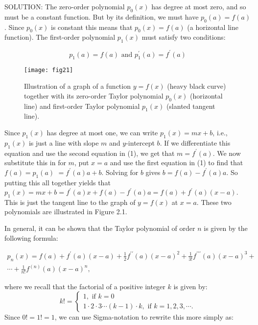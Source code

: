 \documentclass[../main.tex]{subfiles}
\begin{document}
SOLUTION: The zero-order polynomial $p_{0}(x)$ has degree at most zero, and so must be a constant function. But by its definition, we must have $p_{0}(a)=f(a)$. Since $p_{0}(x)$ is constant this means that $p_{0}(x)=f(a)$ (a horizontal line function). The first-order polynomial $p_{1}(x)$ must satisfy two conditions:


\begin{equation}\label{eq:1} \tag{1}
p_{1}(a)=f(a) \text { and } p_{1}^{\prime}(a)=f^{\prime}(a)
\end{equation}


\begin{figure}[H]
\centering
\texttt{[image: fig21]}
\caption{ Illustration of a graph of a function $y=f(x)$ (heavy black curve) together with its zero-order Taylor polynomial $p_{0}(x)$ (horizontal line) and first-order Taylor polynomial $p_{1}(x)$ (slanted tangent line). }
\label{fig:fig_2_1}
\end{figure}

Since $p_{1}(x)$ has degree at most one, we can write $p_{1}(x)=m x+b$, i.e., $p_{1}(x)$ is just a line with slope $m$ and $y$-intercept $b$. If we differentiate this equation and use the second equation in (1), we get that $m=f^{\prime}(a)$. We now substitute this in for $m$, put $x=a$ and use the first equation in (1) to find that $f(a)=p_{1}(a)$ $=f^{\prime}(a) a+b$. Solving for $b$ gives $b=f(a)-f^{\prime}(a) a$. So putting this all together yields that $p_{1}(x)=m x+b=f^{\prime}(a) x+f(a)-f^{\prime}(a) a=f(a)+f^{\prime}(a)(x-a)$. This is just the tangent line to the graph of $y=f(x)$ at $x=a$. These two polynomials are illustrated in Figure 2.1.

In general, it can be shown that the Taylor polynomial of order $n$ is given by the following formula:

\begin{equation}\label{eq:2} \tag{2}
\begin{array}{r}
p_{n}(x)=f(a)+f^{\prime}(a)(x-a)+\frac{1}{2} f^{\prime \prime}(a)(x-a)^{2}+\frac{1}{3 !} f^{\prime \prime \prime}(a)(x-a)^{3}+ \\
\cdots+\frac{1}{n !} f^{(n)}(a)(x-a)^{n},
\end{array}
\end{equation}

where we recall that the factorial of a positive integer $k$ is given by:
$$
k !=\left\{\begin{array}{l}
1, \text { if } k=0 \\
1 \cdot 2 \cdot 3 \cdots(k-1) \cdot k, \text { if } k=1,2,3, \cdots .
\end{array}\right.
$$
Since $0 !=1 !=1$, we can use Sigma-notation to rewrite this more simply as:
\end{document}
